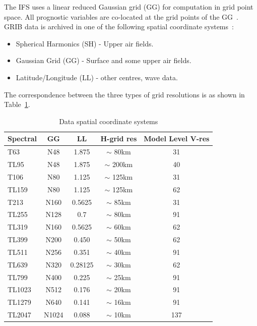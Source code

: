 \fi

The IFS uses a linear reduced Gaussian grid (GG) for computation in grid point space. All prognostic variables are co-located at the grid points of the GG~\cite{ifs-meta}. %
GRIB data is archived in one of the following spatial coordinate systems~\cite{spatial-ecmwf}:   
\begin{itemize}
    \item Spherical Harmonics (SH) - Upper air fields.
    \item Gaussian Grid (GG) - Surface and some upper air fields.
    \item Latitude/Longitude (LL) - other centres, wave data.
\end{itemize}
The correspondence between the three types of grid resolutions is as shown in Table~\ref{tab:spac-coord}.
    
\begin{table}[h!]
\centering
\begin{tabular}{|l|c|c|c|c|}
    \hline      
    Spectral  & GG  & LL & H-grid res & Model Level V-res\\
    \hline
    T63  & N48  & 1.875 & $\sim$ 80km & 31\\
    TL95  & N48  & 1.875 & $\sim$ 200km & 40\\
    T106  & N80  & 1.125 & $\sim$ 125km & 31 \\
    TL159  & N80  & 1.125 & $\sim$ 125km & 62\\
    T213  & N160  & 0.5625 & $\sim$ 85km & 31\\
    TL255  & N128  & 0.7 & $\sim$ 80km & 91\\
    TL319  & N160  & 0.5625 & $\sim$ 60km & 62\\
    TL399  & N200  & 0.450 & $\sim$ 50km & 62 \\
    TL511  & N256  & 0.351 & $\sim$ 40km & 91 \\
    TL639  & N320  & 0.28125 & $\sim$ 30km & 62\\
    TL799  & N400  & 0.225 & $\sim$ 25km & 91\\
    TL1023  & N512  & 0.176 & $\sim$ 20km & 91\\
    TL1279  & N640  & 0.141 & $\sim$ 16km & 91\\
    TL2047  & N1024  & 0.088 & $\sim$ 10km & 137\\  
    \hline
\end{tabular}
\caption{Data spatial coordinate systems}
\label{tab:spac-coord}
\end{table}  

